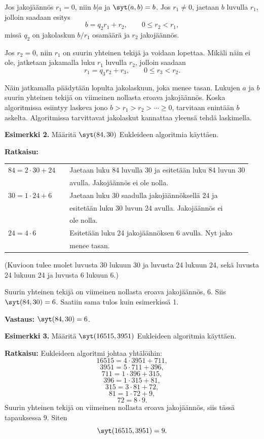 Jos jakojäännös $r_1=0$, niin $b|a$ ja $\syt(a,b)=b$. Jos $r_1\neq 0$, jaetaan $b$ luvulla $r_1$, jolloin saadaan esitys
\[
b= q_2r_1+r_2, \qquad 0 \le r_2 < r_1,
\]
missä $q_2$ on jakolaskun $b/r_1$ osamäärä ja $r_2$ jakojäännös.

Jos $r_2=0$, niin $r_1$ on suurin yhteinen tekijä ja voidaan lopettaa. Mikäli näin ei ole, jatketaan jakamalla luku $r_1$ luvulla $r_2$, jolloin saadaan
\[
r_1 = q_3r_2 + r_3, \qquad 0 \le r_3 < r_2.
\]

Näin jatkamalla päädytään lopulta jakolaskuun, joka menee tasan. Lukujen $a$ ja $b$ suurin yhteinen tekijä on viimeinen nollasta eroava jakojäännös. Koska algoritmissa esiintyy laskeva jono $b>r_1>r_2> \cdots \ge 0$, tarvitaan enintään $b$ askelta. Algoritmissa tarvittavat jakolaskut kannattaa yleensä tehdä laskimella.

{\bf Esimerkki 2.} Määritä $\syt(84, 30)$ Eukleideen
algoritmia käyttäen.

{\bf Ratkaisu:}

\begin{tabular}{lcl}
$84 = 2 \cdot 30 + 24$ & &
Jaetaan luku 84 luvulla 30 ja esitetään luku 84 luvun 30
\\
&& avulla. Jakojäännös ei ole nolla.\\
$30 = 1 \cdot 24 + 6$ & & Jaetaan luku 30 saadulla
jakojäännöksellä 24 ja \\
&& esitetään luku 30 luvun 24 avulla. Jakojäännös ei \\
&& ole nolla. \\
$24 = 4 \cdot 6$ & & Esitetään luku 24 jakojäännöksen 6
avulla. Nyt jako \\
&& menee tasan.
\end{tabular}

(Kuvioon tulee nuolet luvusta 30 lukuun 30 ja luvusta 24
lukuun 24, sekä luvusta 24
lukuun 24 ja luvusta 6 lukuun 6.)

Suurin yhteinen tekijä on viimeinen nollasta eroava
jakojäännös, $6$. Siis $\syt(84, 30) = 6$. Saatiin sama
tulos kuin esimerkissä 1.

{\bf Vastaus:} $\syt(84, 30) = 6$.

{\bf Esimerkki 3.} Määritä $\syt(16515,3951)$ Eukleideen
algoritmia käyttäen.

{\bf Ratkaisu:}
Eukleideen algoritmi johtaa yhtälöihin:
\[
16515 = 4 \cdot 3951 + 711,
\]
\[
3951 = 5 \cdot 711 + 396,
\]
\[
711 = 1 \cdot 396 + 315,
\]
\[
396 = 1 \cdot 315 + 81,
\]
\[
315 = 3 \cdot 81 + 72,
\]
\[
81 = 1 \cdot 72 + 9,
\]
\[
72 = 8 \cdot 9.
\]
Suurin yhteinen tekijä on viimeinen nollasta eroava
jakojäännös, siis tässä tapauksessa $9$. Siten
\[
\syt(16515,3951) = 9.
\]

